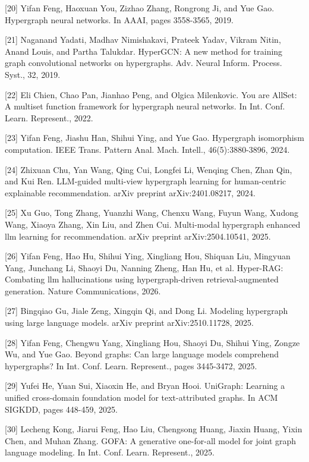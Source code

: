 \documentclass[10pt]{article}
\begin{document}
{[}20{]} Yifan Feng, Haoxuan You, Zizhao Zhang, Rongrong Ji, and Yue Gao. Hypergraph neural networks. In AAAI, pages 3558-3565, 2019.

{[}21{]} Naganand Yadati, Madhav Nimishakavi, Prateek Yadav, Vikram Nitin, Anand Louis, and Partha Talukdar. HyperGCN: A new method for training graph convolutional networks on hypergraphs. Adv. Neural Inform. Process. Syst., 32, 2019.

{[}22{]} Eli Chien, Chao Pan, Jianhao Peng, and Olgica Milenkovic. You are AllSet: A multiset function framework for hypergraph neural networks. In Int. Conf. Learn. Represent., 2022.

{[}23{]} Yifan Feng, Jiashu Han, Shihui Ying, and Yue Gao. Hypergraph isomorphism computation. IEEE Trans. Pattern Anal. Mach. Intell., 46(5):3880-3896, 2024.

{[}24{]} Zhixuan Chu, Yan Wang, Qing Cui, Longfei Li, Wenqing Chen, Zhan Qin, and Kui Ren. LLM-guided multi-view hypergraph learning for human-centric explainable recommendation. arXiv preprint arXiv:2401.08217, 2024.

{[}25{]} Xu Guo, Tong Zhang, Yuanzhi Wang, Chenxu Wang, Fuyun Wang, Xudong Wang, Xiaoya Zhang, Xin Liu, and Zhen Cui. Multi-modal hypergraph enhanced llm learning for recommendation. arXiv preprint arXiv:2504.10541, 2025.

{[}26{]} Yifan Feng, Hao Hu, Shihui Ying, Xingliang Hou, Shiquan Liu, Mingyuan Yang, Junchang Li, Shaoyi Du, Nanning Zheng, Han Hu, et al. Hyper-RAG: Combating llm hallucinations using hypergraph-driven retrieval-augmented generation. Nature Communications, 2026.

{[}27{]} Bingqiao Gu, Jiale Zeng, Xingqin Qi, and Dong Li. Modeling hypergraph using large language models. arXiv preprint arXiv:2510.11728, 2025.

{[}28{]} Yifan Feng, Chengwu Yang, Xingliang Hou, Shaoyi Du, Shihui Ying, Zongze Wu, and Yue Gao. Beyond graphs: Can large language models comprehend hypergraphs? In Int. Conf. Learn. Represent., pages 3445-3472, 2025.

{[}29{]} Yufei He, Yuan Sui, Xiaoxin He, and Bryan Hooi. UniGraph: Learning a unified cross-domain foundation model for text-attributed graphs. In ACM SIGKDD, pages 448-459, 2025.

{[}30{]} Lecheng Kong, Jiarui Feng, Hao Liu, Chengsong Huang, Jiaxin Huang, Yixin Chen, and Muhan Zhang. GOFA: A generative one-for-all model for joint graph language modeling. In Int. Conf. Learn. Represent., 2025.
\end{document}
